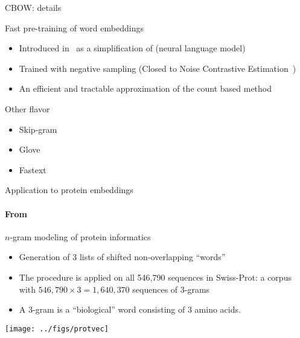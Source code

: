 \begin{frame}{CBOW: details}
  \begin{block}{Fast pre-training of word embeddings}
    \begin{itemize}
    \item Introduced in~\cite{Mikolov13Word2Vec} as a simplification
      of \cite{Bengio01} (neural language model)
    \item Trained with negative sampling (Closed to Noise Contrastive Estimation~\cite{Gutmann10NCE})
    \item An efficient and tractable approximation of the count based method~\cite{Melamud16PMI}
    \end{itemize}
  \end{block}
  \begin{block}{Other flavor}
    \begin{itemize}
    \item Skip-gram~\cite{Mikolov13Word2Vec}
    \item Glove~\cite{Pennington14GLOVE}
    \item Fastext~\cite{Joulin17Bag}
    \end{itemize}
  \end{block}
\end{frame}


\begin{frame}{Application to protein embeddings}
  \framesubtitle{From \cite{Asgari15Continuous}}
  \begin{block}{$n$-gram modeling of protein informatics}
    \begin{itemize}
    \item Generation of 3 lists of shifted non-overlapping ``words''
    \item The procedure is applied on all 546,790 sequences in Swiss-Prot: a corpus with $546,790 \times 3 = 1,640,370$ sequences of $3$-grams 
    \item A $3$-gram is a “biological” word consisting of 3 amino acids.
   \end{itemize}
 \end{block}
 
 \begin{center}
   \texttt{[image: ../figs/protvec]}    
 \end{center}
\end{frame}